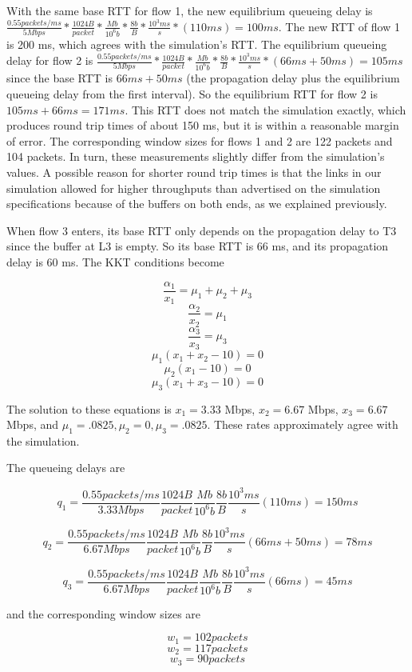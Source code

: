 With the same base RTT for flow 1, the new equilibrium queueing delay is  $\frac{0.55 packets/ms}{5 Mbps} * \frac{1024 B}{packet} * \frac{Mb}{10^6 b} * \frac{8 b}{B} * \frac{10^3 ms}{s} * (110 ms) = 100 ms$. The new RTT of flow 1 is 200 ms, which agrees with the simulation's RTT. The equilibrium queueing delay for flow 2 is $\frac{0.55 packets/ms}{5 Mbps} * \frac{1024 B}{packet} * \frac{Mb}{10^6 b} * \frac{8 b}{B} * \frac{10^3 ms}{s} * (66ms + 50ms) = 105 ms$ since the base RTT is $66 ms + 50 ms$ (the propagation delay plus the equilibrium queueing delay from the first interval). So the equilibrium RTT for flow 2 is $105ms + 66ms = 171 ms$. This RTT does not match the simulation exactly, which produces round trip times of about 150 ms, but it is within a reasonable margin of error.  The corresponding window sizes for flows 1 and 2 are 122 packets and 104 packets. In turn, these measurements slightly differ from the simulation's values. A possible reason for shorter round trip times is that the links in our simulation allowed for higher throughputs than advertised on the simulation specifications because of the buffers on both ends, as we explained previously.

When flow 3 enters, its base RTT only depends on the propagation delay to T3 since the buffer at L3 is empty. So its base RTT is 66 ms, and its propagation delay is 60 ms. The KKT conditions become

$$\frac{\alpha_1}{x_1}=\mu_1+\mu_2+\mu_3$$
$$\frac{\alpha_2}{x_2}=\mu_1$$
$$\frac{\alpha_3}{x_3}=\mu_3$$
$$\mu_1 (x_1 + x_2 - 10) = 0$$
$$\mu_2 (x_1 - 10) = 0$$
$$\mu_3 (x_1 + x_3 - 10) = 0$$

The solution to these equations is $x_1 = 3.33$ Mbps, $x_2 = 6.67$ Mbps, $x_3 = 6.67$ Mbps, and $\mu_1 = .0825, \mu_2 = 0, \mu_3 = .0825$. These rates approximately agree with the simulation.

The queueing delays are

$$q_1 = \frac{0.55 packets/ms}{3.33 Mbps} \frac{1024 B}{packet} \frac{Mb}{10^6 b} \frac{8 b}{B} \frac{10^3 ms}{s} (110 ms) = 150 ms$$

$$q_2 = \frac{0.55 packets/ms}{6.67 Mbps} \frac{1024 B}{packet} \frac{Mb}{10^6 b} \frac{8 b}{B} \frac{10^3 ms}{s} (66 ms + 50 ms) = 78 ms$$

$$q_3 = \frac{0.55 packets/ms}{6.67 Mbps} \frac{1024 B}{packet} \frac{Mb}{10^6 b} \frac{8 b}{B} \frac{10^3 ms}{s} (66 ms) = 45 ms$$

and the corresponding window sizes are

$$w_1 = 102 packets$$
$$w_2 = 117 packets$$
$$w_3 = 90 packets $$

